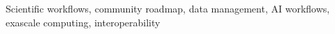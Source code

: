 \begin{IEEEkeywords}
Scientific workflows, community roadmap, data management, AI workflows, exascale computing, interoperability
\end{IEEEkeywords}

